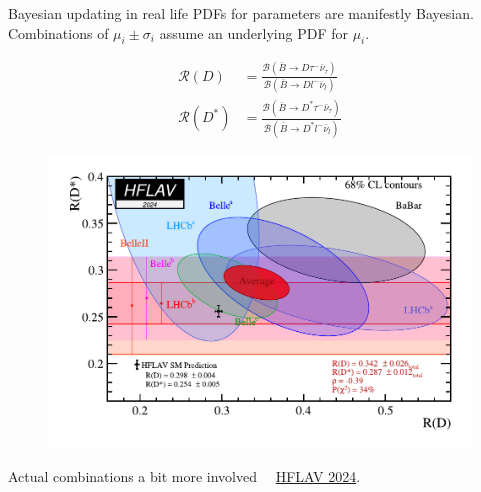 \documentclass[
aspectratio=169,
14pt,
professionalfonts
]{beamer}
\newcommand{\arrow}{~\ding{220}~}
\begin{document}
\begin{frame}{Bayesian updating in real life}
        \vspace{-0.5cm}
        PDFs for parameters are manifestly Bayesian.\\
        Combinations of $\mu_i \pm \sigma_i$ assume an underlying PDF for $\mu_i$.
        \begin{minipage}{0.44\textwidth}
            \begin{align*}
                \mathcal{R}(D) &= \frac{
                    \mathcal{B}(\bar B \to D \tau^- \bar{\nu}_\tau)
                }{
                    \mathcal{B}(\bar B \to D l^- \bar{\nu}_l)
                }\\
                \mathcal{R}(D^*) &= \frac{
                    \mathcal{B}(\bar B \to D^* \tau^- \bar{\nu}_\tau)
                }{
                    \mathcal{B}(\bar B \to D^* l^- \bar{\nu}_l)
                }
            \end{align*}
        \end{minipage}
        \begin{minipage}{0.55\textwidth}
            \begin{figure}
                \centering
                \includegraphics[width=\textwidth]{../plots/rd_rdstar.pdf}
            \end{figure}
        \end{minipage}
        \small Actual combinations a bit more involved \arrow \href{https://arxiv.org/pdf/2411.18639}{HFLAV 2024}.
\end{frame}
\end{document}
